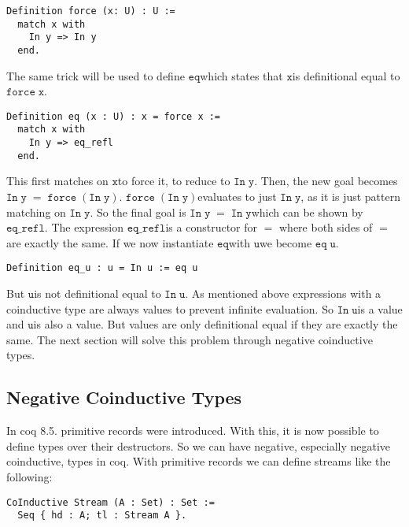 \documentclass[a4paper,cleardoubleempty,BCOR1cm]{scrbook}
\begin{document}
\begin{verbatim}
Definition force (x: U) : U :=
  match x with
    In y => In y
  end.
\end{verbatim}

The same trick will be used to define $\mathtt{eq}$\;which states that $\mathtt{x}$\;is
definitional equal to $\mathtt{force\;x}$.

\begin{verbatim}
Definition eq (x : U) : x = force x :=
  match x with
    In y => eq_refl
  end.
\end{verbatim}

This first matches on $\mathtt{x}$\;to force it, to reduce to $\mathtt{In\;y}$. Then, the new goal
becomes $\mathtt{In\;y\;=\;force\;(In\;y)}$. $\mathtt{force\;(In\;y)}$\;evaluates to just $\mathtt{In\;y}$, as it
is just pattern matching on $\mathtt{In\;y}$. So the final goal is $\mathtt{In\;y\;=\;In\;y}$\;which
can be shown by $\mathtt{eq\_refl}$. The expression $\mathtt{eq\_refl}$\;is a constructor for $\mathtt{=}$
where both sides of $\mathtt{=}$\;are exactly the same. If we now instantiate $\mathtt{eq}$\;with
$\mathtt{u}$\;we become $\mathtt{eq\;u}$.

\begin{verbatim}
Definition eq_u : u = In u := eq u
\end{verbatim}

But $\mathtt{u}$\;is not definitional equal to $\mathtt{In\;u}$.  As mentioned above expressions
with a coinductive type are always values to prevent infinite evaluation.
So $\mathtt{In\;u}$\;is a value and $\mathtt{u}$\;is also a value.  But values are only
definitional equal if they are exactly the same.  The next section will
solve this problem through negative coinductive types.

\subsection{Negative Coinductive Types}
\label{sec:org42e3278}
In coq 8.5. primitive records were introduced. With this, it is now possible
to define types over their destructors. So we can have negative, especially
negative coinductive, types in coq. With primitive records we can define
streams like the following:

\begin{verbatim}
CoInductive Stream (A : Set) : Set :=
  Seq { hd : A; tl : Stream A }.
\end{verbatim}
\end{document}
